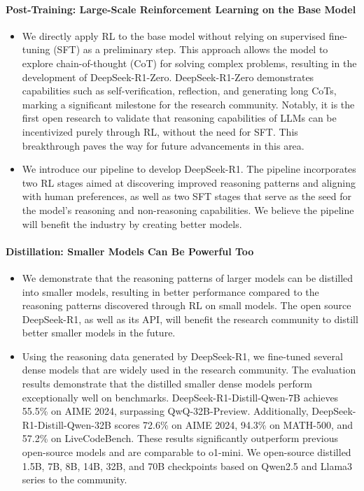 \documentclass[11pt, a4paper, logo, copyright, nonumbering]{deepseek}
\newcommand{\dsri}{DeepSeek-R1}
\newcommand{\dsro}{DeepSeek-R1-Zero}
\begin{document}
\paragraph{Post-Training: Large-Scale Reinforcement Learning on the Base Model}
\begin{itemize}[topsep=0pt]
    \item 
    We directly apply RL to the base model without relying on supervised fine-tuning (SFT) as a preliminary step. This approach allows the model to explore chain-of-thought (CoT) for solving complex problems, resulting in the development of \dsro{}. \dsro{} demonstrates capabilities such as self-verification, reflection, and generating long CoTs, marking a significant milestone for the research community. Notably, it is the first open research to validate that reasoning capabilities of LLMs can be incentivized purely through RL, without the need for SFT. This breakthrough paves the way for future advancements in this area.
    \item
    We introduce our pipeline to develop \dsri{}. The pipeline incorporates two RL stages aimed at discovering improved reasoning patterns and aligning with human preferences, as well as two SFT stages that serve as the seed for the model's reasoning and non-reasoning capabilities.
    We believe the pipeline will benefit the industry by creating better models. 
    
\end{itemize}


\paragraph{Distillation: Smaller Models Can Be Powerful Too}
\begin{itemize}[topsep=0pt]
    \item We demonstrate that the reasoning patterns of larger models can be distilled into smaller models, resulting in better performance compared to the reasoning patterns discovered through RL on small models. The open source \dsri{}, as well as its API, will benefit the research community to distill better smaller models in the future. 
    \item Using the reasoning data generated by \dsri{}, we fine-tuned several dense models that are widely used in the research community. The evaluation results demonstrate that the distilled smaller dense models perform exceptionally well on benchmarks.
    DeepSeek-R1-Distill-Qwen-7B achieves 55.5\% on AIME 2024, surpassing QwQ-32B-Preview. Additionally, DeepSeek-R1-Distill-Qwen-32B scores 72.6\% on AIME 2024, 94.3\% on MATH-500, and 57.2\% on LiveCodeBench. These results significantly outperform previous open-source models and are comparable to o1-mini.
    We open-source distilled 1.5B, 7B, 8B, 14B, 32B, and 70B checkpoints based on Qwen2.5 and Llama3 series to the community.
\end{itemize}
\end{document}
